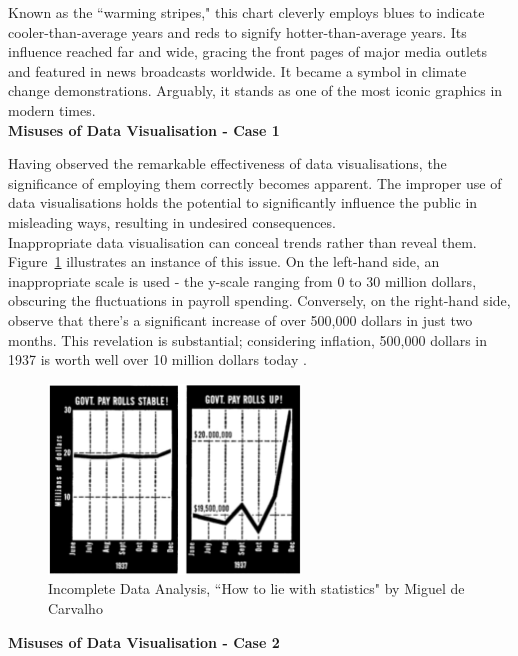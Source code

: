 \documentclass{article}\usepackage[]{graphicx}\usepackage[]{xcolor}
\numberwithin{equation}{section}
\begin{document}
\noindent 
Known as the ``warming stripes," this chart cleverly employs blues to indicate cooler-than-average years and reds to signify hotter-than-average years. Its influence reached far and wide, gracing the front pages of major media outlets and featured in news broadcasts worldwide. It became a symbol in climate change demonstrations. Arguably, it stands as one of the most iconic graphics in modern times.\\

\noindent
\textbf{Misuses of Data Visualisation - Case 1}

\noindent
Having observed the remarkable effectiveness of data visualisations, the significance of employing them correctly becomes apparent. The improper use of data visualisations holds the potential to significantly influence the public in misleading ways, resulting in undesired consequences.\\

\noindent
Inappropriate data visualisation can conceal trends rather than reveal them. Figure~\ref{fig:misuse1} illustrates an instance of this issue. On the left-hand side, an inappropriate scale is used - the y-scale ranging from 0 to 30 million dollars, obscuring the fluctuations in payroll spending. Conversely, on the right-hand side, observe that there's a significant increase of over 500,000 dollars in just two months. This revelation is substantial; considering inflation, 500,000 dollars in 1937 is worth well over 10 million dollars today \cite{worth}.

\begin{figure}[H]
    \centering
    \includegraphics[width=0.6\textwidth]{image_reference/misuse1.png}
    \caption{Incomplete Data Analysis, ``How to lie with statistics" by Miguel de Carvalho \cite{lie}}
    \label{fig:misuse1}
\end{figure}

\noindent 
\textbf{Misuses of Data Visualisation - Case 2}
\end{document}
